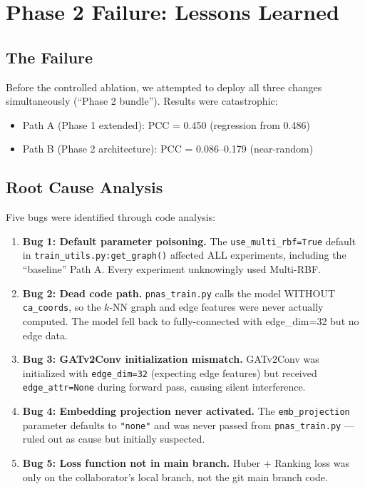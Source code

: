 \section{Phase 2 Failure: Lessons Learned}

\subsection{The Failure}

Before the controlled ablation, we attempted to deploy all three changes simultaneously (``Phase 2 bundle''). Results were catastrophic:
\begin{itemize}
    \item Path A (Phase 1 extended): PCC = 0.450 (regression from 0.486)
    \item Path B (Phase 2 architecture): PCC = 0.086--0.179 (near-random)
\end{itemize}

\subsection{Root Cause Analysis}

Five bugs were identified through code analysis:

\begin{enumerate}
    \item \textbf{Bug 1: Default parameter poisoning.} The \texttt{use\_multi\_rbf=True} default in \texttt{train\_utils.py:get\_graph()} affected ALL experiments, including the ``baseline'' Path A. Every experiment unknowingly used Multi-RBF.

    \item \textbf{Bug 2: Dead code path.} \texttt{pnas\_train.py} calls the model WITHOUT \texttt{ca\_coords}, so the $k$-NN graph and edge features were never actually computed. The model fell back to fully-connected with edge\_dim=32 but no edge data.

    \item \textbf{Bug 3: GATv2Conv initialization mismatch.} GATv2Conv was initialized with \texttt{edge\_dim=32} (expecting edge features) but received \texttt{edge\_attr=None} during forward pass, causing silent interference.

    \item \textbf{Bug 4: Embedding projection never activated.} The \texttt{emb\_projection} parameter defaults to \texttt{"none"} and was never passed from \texttt{pnas\_train.py} --- ruled out as cause but initially suspected.

    \item \textbf{Bug 5: Loss function not in main branch.} Huber + Ranking loss was only on the collaborator's local branch, not the git main branch code.
\end{enumerate}

